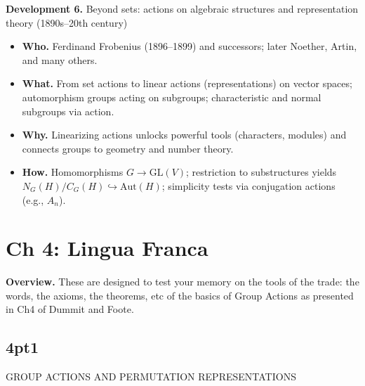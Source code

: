 \documentclass[12pt]{article}
\theoremstyle{definition}
\begin{document}
\newpage

\textbf{Development 6.} Beyond sets: actions on algebraic structures and representation theory (1890s–20th century)

\newpage

\begin{itemize}
  \item \textbf{Who.} Ferdinand Frobenius (1896–1899) and successors; later Noether, Artin, and many others.
  \item \textbf{What.} From set actions to linear actions (representations) on vector spaces; automorphism groups acting on subgroups; characteristic and normal subgroups via action.
  \item \textbf{Why.} Linearizing actions unlocks powerful tools (characters, modules) and connects groups to geometry and number theory.
  \item \textbf{How.} Homomorphisms $G \to \mathrm{GL}(V)$; restriction to substructures yields\\ $N_G(H)/C_G(H) \hookrightarrow \mathrm{Aut}(H)$; simplicity tests via conjugation actions (e.g., $A_n$).
\end{itemize}

\newpage

\dotfill
\section*{Ch 4: Lingua Franca}
\dotfill


\newpage

\noindent \textbf{Overview.} These are designed to test your memory on the tools of the trade: the words, the axioms, the theorems, etc of the basics of Group Actions as presented in Ch4 of Dummit and Foote.

\newpage

\subsection*{4pt1}

\newpage

GROUP ACTIONS AND PERMUTATION REPRESENTATIONS 

\newpage

\end{document}
